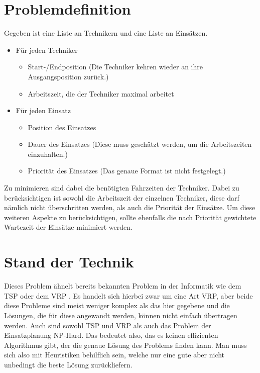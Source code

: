 \documentclass[a4paper,notitlepage,12pt]{report}
\begin{document}
\section{Problemdefinition}

Gegeben ist eine Liste an Technikern und eine Liste an Einsätzen.

\begin{itemize}
    \item
    Für jeden Techniker
    \begin{itemize}
        \item Start-/Endposition (Die Techniker kehren wieder an ihre Ausgangsposition zurück.)
        \item Arbeitszeit, die der Techniker maximal arbeitet
    \end{itemize}
    \item
    Für jeden Einsatz
    \begin{itemize}
        \item Position des Einsatzes
        \item Dauer des Einsatzes (Diese muss geschätzt werden, um die Arbeitszeiten einzuhalten.)
        \item Priorität des Einsatzes (Das genaue Format ist nicht festgelegt.)
    \end{itemize}
\end{itemize}

Zu minimieren sind dabei die benötigten Fahrzeiten der Techniker. Dabei zu
berücksichtigen ist sowohl die Arbeitszeit der einzelnen Techniker, diese darf
nämlich nicht überschritten werden, als auch die Priorität der Einsätze. Um
diese weiteren Aspekte zu berücksichtigen, sollte ebenfalls die nach Priorität
gewichtete Wartezeit der Einsätze minimiert werden.

\section{Stand der Technik}

Dieses Problem ähnelt bereits bekannten Problem in der Informatik wie dem TSP \cite{tsp} oder
dem VRP \cite{vrp}. Es handelt sich hierbei zwar um eine Art VRP, aber beide diese Probleme
sind meist weniger komplex als das hier gegebene und
die Lösungen, die für diese angewandt werden, können nicht einfach übertragen werden.
Auch sind sowohl TSP und VRP als auch das Problem der Einsatzplanung NP-Hard. Das
bedeutet also, das es keinen effizienten Algorithmus gibt, der die genaue Lösung
des Problems finden kann. Man muss sich also mit Heuristiken behilflich sein, welche
nur eine gute aber nicht unbedingt die beste Lösung zurückliefern.
\end{document}
